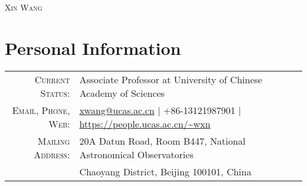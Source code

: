 \documentclass[letterpaper,10pt]{article}
\begin{document}
\par{\centering
  {\LARGE \textsc{Xin Wang}}
\par}

\section{Personal Information}
\vspace*{1ex}
\begin{tabular}{rl}
    \textsc{Current Status:}  & Associate Professor at University of Chinese Academy of Sciences    \\
    \textsc{Email, Phone, Web:}  & \href{mailto:xwang@ucas.ac.cn}{xwang@ucas.ac.cn}  |  +86-13121987901  |  \url{https://people.ucas.ac.cn/~wxn}\\
    \textsc{Mailing Address:} & 20A Datun Road, Room B447, National Astronomical Observatories  \\
                              & Chaoyang District, Beijing 100101, China    \\
\end{tabular}


\end{document}
